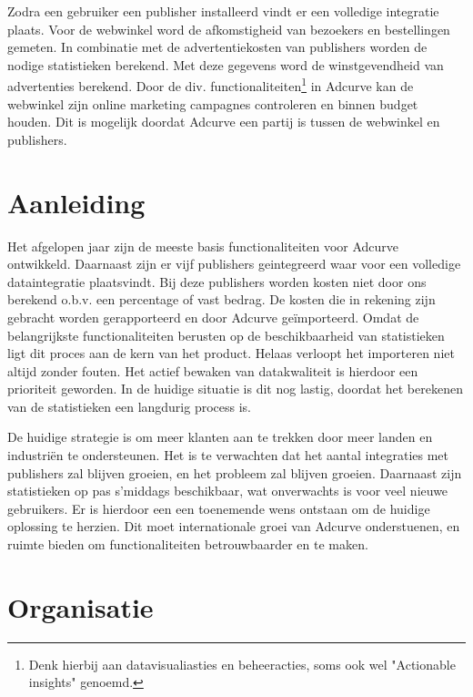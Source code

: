 Zodra een gebruiker een publisher installeerd vindt er een volledige integratie plaats. Voor de webwinkel word de afkomstigheid van bezoekers en bestellingen gemeten. In combinatie met de advertentiekosten van publishers worden de nodige statistieken berekend. Met deze gegevens word de winstgevendheid van advertenties berekend.
Door de div. functionaliteiten\footnote{Denk hierbij aan datavisualiasties en beheeracties, soms ook wel "Actionable insights" genoemd.} in Adcurve kan de webwinkel zijn online marketing campagnes controleren en binnen budget houden. Dit is mogelijk doordat Adcurve een partij is tussen de webwinkel en publishers.

\section{Aanleiding} %

Het afgelopen jaar zijn de meeste basis functionaliteiten voor Adcurve ontwikkeld. Daarnaast zijn er vijf publishers geintegreerd waar voor een volledige dataintegratie plaatsvindt. Bij deze publishers worden kosten niet door ons berekend o.b.v. een percentage of vast bedrag. De kosten die in rekening zijn gebracht worden gerapporteerd en door Adcurve geïmporteerd. Omdat de belangrijkste functionaliteiten berusten op de beschikbaarheid van statistieken ligt dit proces aan de kern van het product. Helaas verloopt het importeren niet altijd zonder fouten. Het actief bewaken van datakwaliteit is hierdoor een prioriteit geworden. In de huidige situatie is dit nog lastig, doordat het berekenen van de statistieken een langdurig process is.

De huidige strategie is om meer klanten aan te trekken door meer landen en industriën te ondersteunen. Het is te verwachten dat het aantal integraties met publishers zal blijven groeien, en het probleem zal blijven groeien. Daarnaast zijn statistieken op pas s'middags beschikbaar, wat onverwachts is voor veel nieuwe gebruikers. Er is hierdoor een een toenemende wens ontstaan om de huidige oplossing te herzien. Dit moet internationale groei van Adcurve onderstuenen, en ruimte bieden om functionaliteiten betrouwbaarder en te maken.

\section{Organisatie} %

